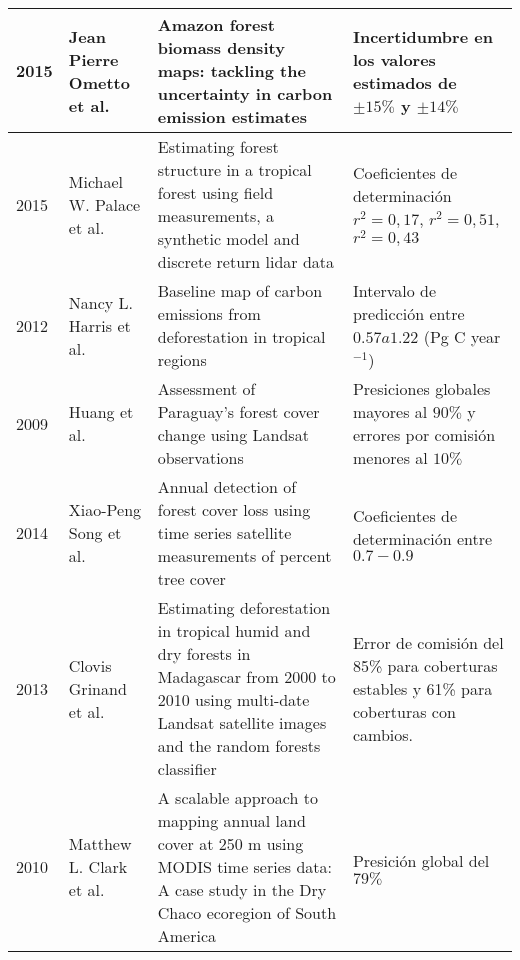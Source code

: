 \begin{table}[!hbtp]
\begin{tabular}{|p{3cm}|p{3cm}|p{3cm}|p{3cm}|}
		2015          & Jean Pierre Ometto et al.                              & Amazon forest biomass density maps: tackling the uncertainty in carbon emission estimates                                                                              & Incertidumbre en los valores estimados de $ \pm 15\% $ y $ \pm 14\% $                     \\ \hline
		2015          & Michael W. Palace et al.                               & Estimating forest structure in a tropical forest using field measurements, a synthetic model and discrete return lidar data                                            & Coeficientes de determinaci\'on $ r^{2}=0,17 $, $ r^{2}=0,51 $, $ r^{2}=0,43 $            \\ \hline
		2012          & Nancy L. Harris et al.                                 & Baseline map of carbon emissions from deforestation in tropical regions                                                                                                & Intervalo de predicci\'on entre $ 0.57 a 1.22 $ (Pg C year$ ^{-1} $)                      \\ \hline
		2009          & Huang et al.                                           & Assessment of Paraguay's forest cover change using Landsat observations                                                                                                & Presiciones globales mayores al $90\%$ y errores por comisi\'on menores al $10\%$         \\ \hline
		2014          & Xiao-Peng Song et al.                                  & Annual detection of forest cover loss using time series satellite measurements of percent tree cover                                                                   & Coeficientes de determinaci\'on entre $ 0.7 - 0.9 $                                       \\ \hline
		2013          & Clovis Grinand et al.                                  & Estimating deforestation in tropical humid and dry forests in Madagascar from 2000 to 2010 using multi-date Landsat satellite images and the random forests classifier & Error de comisi\'on del 85\% para coberturas estables y 61\% para coberturas con cambios. \\ \hline
		2010          & Matthew L. Clark et al.                                & A scalable approach to mapping annual land cover at 250 m using MODIS time series data: A case study in the Dry Chaco ecoregion of South America                       & Presici\'on global del $79\%$                                                             \\ \hline

\end{tabular}
\end{table}
